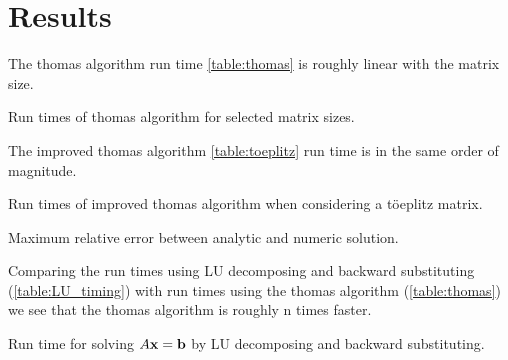 \section*{Results}


The thomas algorithm run time \cref{table:thomas} is roughly linear with the
matrix size.

\begin{table}[h]
  \centering
  \caption{Run times of thomas algorithm for selected matrix sizes.}
  \label{table:thomas}
\end{table}

The improved thomas algorithm \cref{table:toeplitz} run time is in the same
order of magnitude.

\begin{table}[h]
  \centering
  \caption{Run times of improved thomas algorithm when considering a töeplitz matrix.}
  \label{table:toeplitz}
\end{table}

\begin{table}[h]
  \centering
  \caption{Maximum relative error between analytic and numeric solution.}
  \label{table:relative_error}
\end{table}

Comparing the run times using LU decomposing and backward substituting
(\cref{table:LU_timing}) with run times using the thomas algorithm
(\cref{table:thomas}) we see that the thomas algorithm is roughly n times
faster.

\begin{table}[h]
  \centering
  \caption{Run time for solving $A\mathbf{x} = \mathbf{b}$ by LU decomposing and backward substituting.}
  \label{table:LU_timing}
\end{table}
